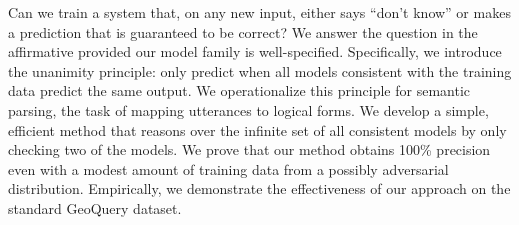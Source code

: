 Can we train a system that, on any new input, either says ``don't know'' or makes a prediction that is guaranteed to be correct? We answer the question in the affirmative provided our model family is well-specified. Specifically, we introduce the unanimity principle: only predict when all models consistent with the training data predict the same output. We operationalize this principle for semantic parsing, the task of mapping utterances to logical forms. We develop a simple, efficient method that reasons over the infinite set of all consistent models by only checking two of the models. We prove that our method obtains 100\% precision even with a modest amount of training data from a possibly adversarial distribution. Empirically, we demonstrate the effectiveness of our approach on the standard GeoQuery dataset.

